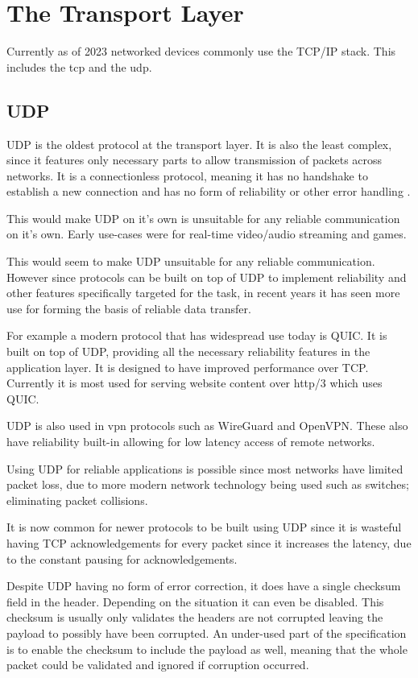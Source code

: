 \section{The Transport Layer}
Currently as of 2023 networked devices commonly use the TCP/IP stack. This includes the \acrfull{tcp} and the \acrfull{udp}.

\subsection*{UDP}
UDP is the oldest protocol at the transport layer. It is also the least complex, since it features only necessary parts to allow transmission of packets across networks. It is a connectionless protocol, meaning it has no handshake to establish a new connection and has no form of reliability or other error handling \parencite{udp-rfc768}.

This would make UDP on it's own is unsuitable for any reliable communication on it's own. Early use-cases were for real-time video/audio streaming and games.

This would seem to make UDP unsuitable for any reliable communication. However since protocols can be built on top of UDP to implement reliability and other features specifically targeted for the task, in recent years it has seen more use for forming the basis of reliable data transfer.

For example a modern protocol that has widespread use today is QUIC. It is built on top of UDP, providing all the necessary reliability features in the application layer. It is designed to have improved performance over TCP. Currently it is most used for serving website content over http/3 which uses QUIC.

UDP is also used in \acrfull{vpn} protocols such as WireGuard and OpenVPN. These also have reliability built-in allowing for low latency access of remote networks.

Using UDP for reliable applications is possible since most networks have limited packet loss, due to more modern network technology being used such as switches; eliminating packet collisions.

It is now common for newer protocols to be built using UDP since it is wasteful having TCP acknowledgements for every packet since it increases the latency, due to the constant pausing for acknowledgements.

Despite UDP having no form of error correction, it does have a single checksum field in the header. Depending on the situation it can even be disabled. This checksum is usually only validates the headers are not corrupted leaving the payload to possibly have been corrupted. An under-used part of the specification is to enable the checksum to include the payload as well, meaning that the whole packet could be validated and ignored if corruption occurred.

